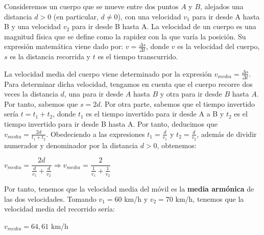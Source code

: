 Consideremos un cuerpo que se mueve entre dos puntos $A$ y $B$, alejados una distancia $d > 0$ (en particular, $d \neq 0$), con una velocidad $v_{1}$ para ir desde A hasta B y una velocidad $v_{2}$ para ir desde B hasta A. La velocidad de un cuerpo es una magnitud física que se define como la rapidez con la que varía la posición. Su expresión matemática viene dado por: $v = \frac{\Delta s}{\Delta t}$, donde $v$ es la velocidad del cuerpo, $s$ es la distancia recorrida y $t$ es el tiempo transcurrido. 

La velocidad media del cuerpo viene determinado por la expresión $v_{media} = \frac{\Delta s}{\Delta t}$. Para determinar dicha velocidad, tengamos en cuenta que el cuerpo recorre dos veces la distancia $d$, una para ir desde $A$ hasta $B$ y otra para ir desde $B$ hasta $A$. Por tanto, sabemos que $s = 2d$. Por otra parte, sabemos que el tiempo invertido sería $t = t_{1} + t_{2}$, donde $t_{1}$ es el tiempo invertido para ir desde A a B y $t_{2}$ es el tiempo invertido para ir desde B hasta A. Por tanto, deducimos que $v_{media} = \frac{2d}{t_{1} + t_{2}}$. Obedeciendo a las expresiones $t_{1} = \frac{d}{v_{1}}$ y $t_{2} = \frac{d}{v_{2}}$, además de dividir numerador y denominador por la distancia $d > 0$, obtenemos:

\begin{center}
	$v_{media} = \dfrac{2d}{\frac{d}{v_{1}} + \frac{d}{v_{2}}} 	\Rightarrow  v_{media} = \dfrac{2}{\frac{1}{v_{1}} + \frac{1}{v_{2}}}$
\end{center}

Por tanto, tenemos que la velocidad media del móvil es la \textbf{media armónica} de las dos velocidades. Tomando $v_{1} = 60$ km/h y $v_{2} = 70$ km/h, tenemos que la velocidad media del recorrido sería:

\begin{center}
	$v_{media} = 64,61$ km/h
\end{center}